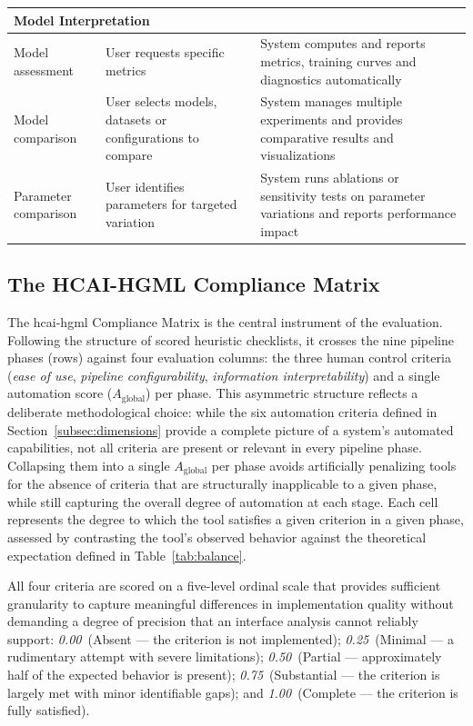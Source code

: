 \documentclass[a4paper,twoside]{article}
\begin{document}
\begin{table}[h!]
{\begin{tabular}{l p{6cm} p{6cm}}
\midrule
\multicolumn{3}{l}{\textbf{Model Interpretation}} \\
\midrule
Model assessment      & User requests specific metrics & System computes and reports metrics, training curves and diagnostics automatically \\
Model comparison      & User selects models, datasets or configurations to compare & System manages multiple experiments and provides comparative results and visualizations \\
Parameter comparison  & User identifies parameters for targeted variation & System runs ablations or sensitivity tests on parameter variations and reports performance impact \\
\bottomrule
\end{tabular}%
}
\end{table}

\subsection{The HCAI-HGML Compliance Matrix}
\label{subsec:matrix}

The \gls{hcai}-\gls{hgml} Compliance Matrix is the central instrument of the
evaluation. Following the structure of scored heuristic checklists, it crosses 
the nine pipeline phases (rows) against four evaluation columns: the three 
human control criteria (\emph{ease of use}, \emph{pipeline 
configurability}, \emph{information interpretability}) and a single 
automation score ($A_{\text{global}}$) per phase. This asymmetric structure 
reflects a deliberate methodological choice: while the six automation 
criteria defined in Section~\ref{subsec:dimensions} provide a complete 
picture of a system's automated capabilities, not all criteria are present 
or relevant in every pipeline phase. Collapsing them into a single 
$A_{\text{global}}$ per phase avoids artificially penalizing tools for the 
absence of criteria that are structurally inapplicable to a given phase, 
while still capturing the overall degree of automation at each stage. Each
cell represents the degree to which the tool satisfies a given criterion in a
given phase, assessed by contrasting the tool's observed behavior against the
theoretical expectation defined in Table~\ref{tab:balance}.

All four criteria are scored on a five-level ordinal scale that provides
sufficient granularity to capture meaningful differences in implementation
quality without demanding a degree of precision that an interface
analysis cannot reliably support:
\emph{0.00}~(Absent --- the criterion is not implemented);
\emph{0.25}~(Minimal --- a rudimentary attempt with severe limitations);
\emph{0.50}~(Partial --- approximately half of the expected behavior is
present); \emph{0.75}~(Substantial --- the criterion is largely met with
minor identifiable gaps); and \emph{1.00}~(Complete --- the criterion is
fully satisfied).
\end{document}

